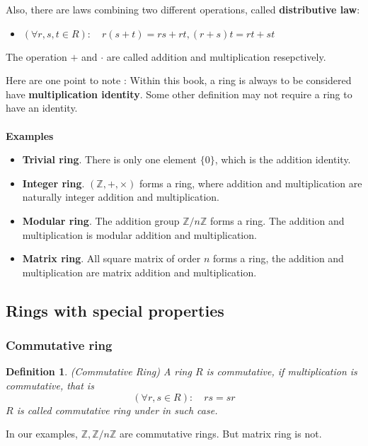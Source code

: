 \documentclass[a4paper, pdf, 11.5pt]{article}
\newtheorem{definition}{Definition}
\begin{document}
Also, there are laws combining two different operations, called \textbf{distributive law}:
\begin{itemize}
  \item  $(\forall r,s,t\in R):\quad r(s+t) = rs+rt, (r+s)t = rt+st$
\end{itemize}
The operation $+$ and $\cdot$ are called addition and multiplication resepctively. 

Here are one point to note :  Within this book, a ring is always to be considered have \textbf{multiplication identity}. Some other definition may not require a ring to have an identity. \\
\\
\noindent
\textbf{Examples}
\begin{itemize}
  \item  \textbf{Trivial ring}.  There is only one element $\{0\}$, which is the addition identity.
  \item  \textbf{Integer ring}.  $(\mathbb{Z}, +, \times)$ forms a ring, where addition and multiplication are naturally integer addition and multiplication.
  \item \textbf{Modular ring}.  The addition group $\mathbb{Z}/n\mathbb{Z}$ forms a ring. The addition and multiplication is modular addition and multiplication. 
  \item  \textbf{Matrix ring}.  All square matrix of order $n$ forms a ring, the addition and multiplication are matrix addition and multiplication.
\end{itemize}

\subsection{Rings with special properties}
\subsubsection{Commutative ring}
\begin{definition}(Commutative Ring)
  A ring $R$ is commutative, if  multiplication is commutative, that is 
$$(\forall r,s\in R):\quad rs = sr$$
$R$ is called commutative ring under in such case.
\end{definition}

In our examples, $\mathbb{Z}, \mathbb{Z}/n\mathbb{Z}$ are commutative rings. But matrix ring is not. 
\end{document}
